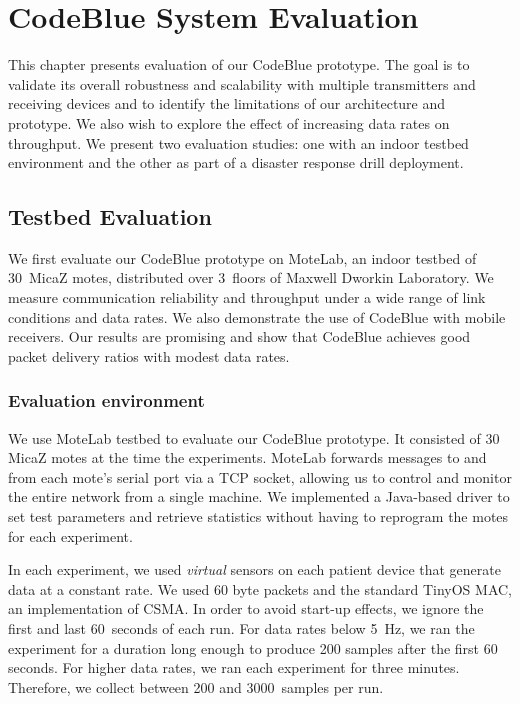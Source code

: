 \chapter{CodeBlue System Evaluation}
\label{chap-eval}
\label{chap-deploy}

This chapter presents evaluation of our CodeBlue prototype. 
The goal is to validate its overall robustness and scalability with multiple
transmitters and receiving devices and to identify the limitations
of our architecture and prototype. We also wish to explore the effect of
increasing data rates on throughput. We present two evaluation studies: one
with an indoor testbed environment and the other as part of a disaster
response drill deployment.

\section{Testbed Evaluation}
\label{sec-cb-eval}
\label{sec-cb-testbed-eval}

We first evaluate our CodeBlue prototype on
MoteLab\cite{motelab-spots05}, an indoor testbed of 30~MicaZ motes,
distributed over 3~floors of Maxwell Dworkin Laboratory.
We measure communication reliability and throughput under a wide range
of link conditions and data rates. We also demonstrate the use of
CodeBlue with mobile receivers.
Our results are promising and show that CodeBlue achieves good packet
delivery ratios with modest data rates. 


\subsection{Evaluation environment}

We use MoteLab testbed to evaluate our CodeBlue prototype. It consisted of 30
MicaZ motes at the time the experiments.  MoteLab forwards messages to and
from each mote's serial port via a TCP socket, allowing us to control and
monitor the entire network from a single machine. We implemented a Java-based
driver to set test parameters and retrieve statistics without having to
reprogram the motes for each experiment. 

In each experiment, we used {\em virtual} sensors on each patient device
that generate data at a constant rate. We used 60 byte packets and the
standard TinyOS MAC, an implementation of CSMA. In order to avoid
start-up effects, we ignore the first and last 60~seconds of each run. 
For data rates below 5~Hz, we ran the experiment for a duration long
enough to produce 200 samples after the first 60 seconds. For higher data
rates, we ran each experiment for three minutes. Therefore, we collect between
200 and 3000~samples per run. 


